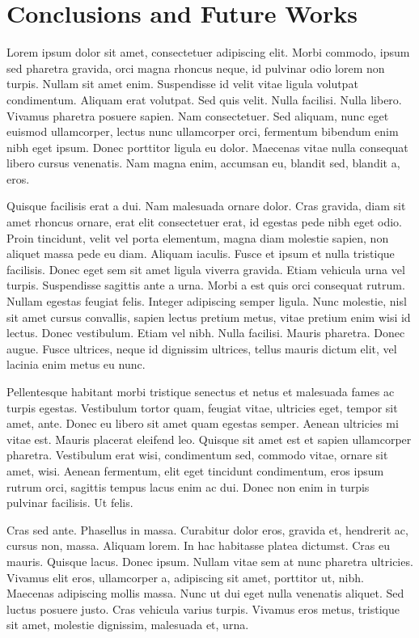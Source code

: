 \chapter{Conclusions and Future Works}
\label{conclusion}

Lorem ipsum dolor sit amet, consectetuer adipiscing elit. Morbi commodo, ipsum sed pharetra gravida, orci magna rhoncus neque, id pulvinar odio lorem non turpis. Nullam sit amet enim. Suspendisse id velit vitae ligula volutpat condimentum. Aliquam erat volutpat. Sed quis velit. Nulla facilisi. Nulla libero. Vivamus pharetra posuere sapien. Nam consectetuer. Sed aliquam, nunc eget euismod ullamcorper, lectus nunc ullamcorper orci, fermentum bibendum enim nibh eget ipsum. Donec porttitor ligula eu dolor. Maecenas vitae nulla consequat libero cursus venenatis. Nam magna enim, accumsan eu, blandit sed, blandit a, eros.

Quisque facilisis erat a dui. Nam malesuada ornare dolor. Cras gravida, diam sit amet rhoncus ornare, erat elit consectetuer erat, id egestas pede nibh eget odio. Proin tincidunt, velit vel porta elementum, magna diam molestie sapien, non aliquet massa pede eu diam. Aliquam iaculis. Fusce et ipsum et nulla tristique facilisis. Donec eget sem sit amet ligula viverra gravida. Etiam vehicula urna vel turpis. Suspendisse sagittis ante a urna. Morbi a est quis orci consequat rutrum. Nullam egestas feugiat felis. Integer adipiscing semper ligula. Nunc molestie, nisl sit amet cursus convallis, sapien lectus pretium metus, vitae pretium enim wisi id lectus. Donec vestibulum. Etiam vel nibh. Nulla facilisi. Mauris pharetra. Donec augue. Fusce ultrices, neque id dignissim ultrices, tellus mauris dictum elit, vel lacinia enim metus eu nunc.

Pellentesque habitant morbi tristique senectus et netus et malesuada fames ac turpis egestas. Vestibulum tortor quam, feugiat vitae, ultricies eget, tempor sit amet, ante. Donec eu libero sit amet quam egestas semper. Aenean ultricies mi vitae est. Mauris placerat eleifend leo. Quisque sit amet est et sapien ullamcorper pharetra. Vestibulum erat wisi, condimentum sed, commodo vitae, ornare sit amet, wisi. Aenean fermentum, elit eget tincidunt condimentum, eros ipsum rutrum orci, sagittis tempus lacus enim ac dui. Donec non enim in turpis pulvinar facilisis. Ut felis.

Cras sed ante. Phasellus in massa. Curabitur dolor eros, gravida et, hendrerit ac, cursus non, massa. Aliquam lorem. In hac habitasse platea dictumst. Cras eu mauris. Quisque lacus. Donec ipsum. Nullam vitae sem at nunc pharetra ultricies. Vivamus elit eros, ullamcorper a, adipiscing sit amet, porttitor ut, nibh. Maecenas adipiscing mollis massa. Nunc ut dui eget nulla venenatis aliquet. Sed luctus posuere justo. Cras vehicula varius turpis. Vivamus eros metus, tristique sit amet, molestie dignissim, malesuada et, urna.

